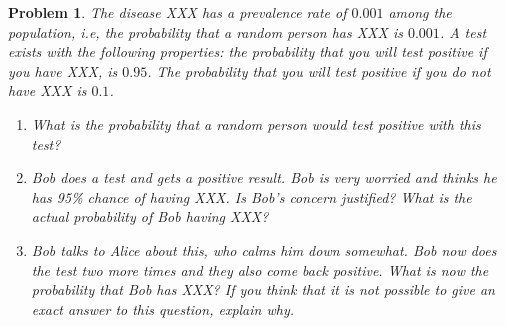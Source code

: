 \documentclass{../homework}
\newtheorem{problem}{Problem}
\begin{document}
\begin{problem}
    The disease XXX has a prevalence rate of $0.001$ among the population, i.e,
    the probability that a random person has XXX is $0.001$. A test exists with
    the following properties: the probability that you will test positive if you
    have XXX, is $0.95$. The probability that you will test positive if you do
    not have XXX is $0.1$.
\begin{enumerate}[label=(\alph*)]
    \item What is the probability that a random person would test positive with
    this test?
    \item Bob does a test and gets a positive result. Bob is very worried and
    thinks he has 95\% chance of having XXX. Is Bob's concern justified? What is
    the actual probability of Bob having XXX?
    \item Bob talks to Alice about this, who calms him down somewhat. Bob now
    does the test two more times and they also come back positive. What is now
    the probability that Bob has XXX? If you think that it is not possible to
    give an exact answer to this question, explain why.
\end{enumerate}
\end{problem}
\end{document}
